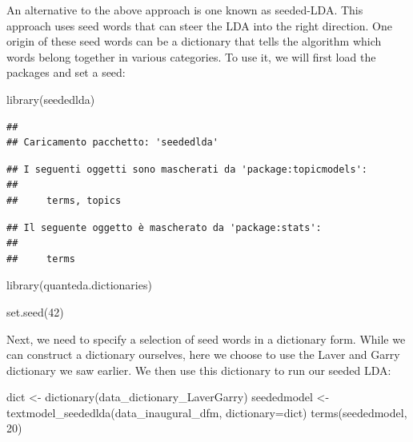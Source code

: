 \documentclass[
]{book}
\newenvironment{Shaded}{\begin{snugshade}}{\end{snugshade}}
\newcommand{\AttributeTok}[1]{\textcolor[rgb]{0.77,0.63,0.00}{#1}}
\newcommand{\DecValTok}[1]{\textcolor[rgb]{0.00,0.00,0.81}{#1}}
\newcommand{\FunctionTok}[1]{\textcolor[rgb]{0.00,0.00,0.00}{#1}}
\newcommand{\NormalTok}[1]{#1}
\newcommand{\OtherTok}[1]{\textcolor[rgb]{0.56,0.35,0.01}{#1}}
\begin{document}
An alternative to the above approach is one known as seeded-LDA. This approach uses seed words that can steer the LDA into the right direction. One origin of these seed words can be a dictionary that tells the algorithm which words belong together in various categories. To use it, we will first load the packages and set a seed:

\begin{Shaded}
\begin{Highlighting}[]
\FunctionTok{library}\NormalTok{(seededlda)}
\end{Highlighting}
\end{Shaded}

\begin{verbatim}
## 
## Caricamento pacchetto: 'seededlda'
\end{verbatim}

\begin{verbatim}
## I seguenti oggetti sono mascherati da 'package:topicmodels':
## 
##     terms, topics
\end{verbatim}

\begin{verbatim}
## Il seguente oggetto è mascherato da 'package:stats':
## 
##     terms
\end{verbatim}

\begin{Shaded}
\begin{Highlighting}[]
\FunctionTok{library}\NormalTok{(quanteda.dictionaries)}

\FunctionTok{set.seed}\NormalTok{(}\DecValTok{42}\NormalTok{)}
\end{Highlighting}
\end{Shaded}

Next, we need to specify a selection of seed words in a dictionary form. While we can construct a dictionary ourselves, here we choose to use the Laver and Garry dictionary we saw earlier. We then use this dictionary to run our seeded LDA:

\begin{Shaded}
\begin{Highlighting}[]
\NormalTok{dict }\OtherTok{\textless{}{-}} \FunctionTok{dictionary}\NormalTok{(data\_dictionary\_LaverGarry)}
\NormalTok{seededmodel }\OtherTok{\textless{}{-}} \FunctionTok{textmodel\_seededlda}\NormalTok{(data\_inaugural\_dfm, }\AttributeTok{dictionary=}\NormalTok{dict)}
\FunctionTok{terms}\NormalTok{(seededmodel, }\DecValTok{20}\NormalTok{)}
\end{Highlighting}
\end{Shaded}
\end{document}
